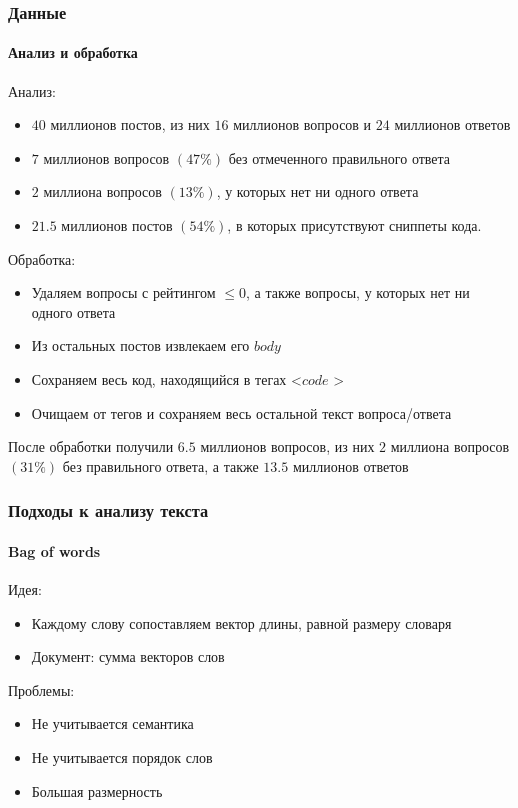 \documentclass[10pt]{beamer}
\begin{document}

\begin{frame}
\frametitle{Данные}
\framesubtitle{Анализ и обработка}

Анализ:
\begin{itemize}
	\item $40$ миллионов постов, из них $16$ миллионов вопросов и $24$ миллионов ответов
	\item $7$ миллионов вопросов $(47\%)$ без отмеченного правильного ответа
	\item $2$ миллиона вопросов $(13\%)$, у которых нет ни одного ответа
	\item $21.5$ миллионов постов $(54\%)$, в которых присутствуют сниппеты кода. 
\end{itemize}

Обработка:
\begin{itemize}
	\item Удаляем вопросы с рейтингом $\leqslant 0$, а также вопросы, у которых нет ни одного ответа
	\item Из остальных постов извлекаем его $body$
	\item Сохраняем весь код, находящийся в тегах \textless $code$ \textgreater
	\item Очищаем от тегов и сохраняем весь остальной текст вопроса/ответа
\end{itemize}

После обработки получили $6.5$ миллионов вопросов, из них $2$ миллиона вопросов $(31\%)$ без правильного ответа, а также $13.5$ миллионов ответов

\end{frame}


\begin{frame}
\frametitle{Подходы к анализу текста}
\framesubtitle{Bag of words}

Идея:
\begin{itemize}
    \item Каждому слову сопоставляем вектор длины, равной размеру словаря
	\item Документ: сумма векторов слов
\end{itemize}
Проблемы:
\begin{itemize}
    \item Не учитывается семантика
    \item Не учитывается порядок слов
	\item Большая размерность
\end{itemize}

\end{frame}
\end{document}
